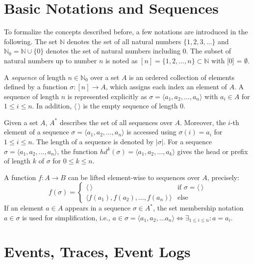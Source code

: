 \section{Basic Notations and Sequences}

To formalize the concepts described before, a few notations are introduced in the following.
The set $\mathbb{N}$ denotes the set of all natural numbers $\{1, 2, 3, \dots\}$ and $\mathbb{N}_0 = \mathbb{N} \cup \{0\}$ denotes the set of natural numbers including 0.
The subset of natural numbers up to number $n$ is noted as $[n] = \{1, 2, \dots, n\} \subset \mathbb{N}$ with [0] = $\emptyset$.
\begin{definition}[Sequence]
		A \textit{sequence} of length $n \in \mathbb{N}_0$ over a set $A$ is an ordered collection of elements defined by a function $\sigma \colon [n]\to A$, which assigns each index an element of $A$.
		A sequence  of length $n$ is represented explicitly as $\sigma = \langle a_1, a_2, \dots, a_n\rangle $ with $a_i \in A$ for $1 \leq i \leq n$. In addition, $\langle~\rangle$ is the empty sequence of length $0$.
\end{definition}
Given a set $A$, $A^*$ describes the set of all sequences over $A$.
Moreover, the $i$-th element of a sequence $\sigma = \langle a_1, a_2, \dots, a_n\rangle$ is accessed using $\sigma(i)= a_i$ for $1 \leq i \leq n$.
The length of a sequence is denoted by $|\sigma|$.
For a sequence $\sigma=\langle a_1, a_2, \dots, a_n\rangle$, the function
$hd^k(\sigma)= \langle a_1, a_2, \dots, a_k\rangle$ gives the head or prefix of length $k$ of $\sigma$ for $0 \leq k \leq n$.

A function $f \colon A \to B$ can be lifted element-wise to sequences over $A$, precisely:
\begin{equation*}
f(\sigma) =
\begin{cases}
\langle~\rangle & \text{if $\sigma = \langle~\rangle$} \\
\langle f(a_1), f(a_2), \dots, f(a_n)\rangle & \text{else} 
\end{cases}
\end{equation*}
If an element $a \in A$ appears in a sequence $\sigma \in A^*$, the set membership notation $a \in \sigma$ is used for simplification, i.e., $a \in \sigma = \langle a_1, a_2, \dots a_n \rangle \iff \exists_{1 \leq i \leq n} \colon a = a_i$.

\section{Events, Traces, Event Logs}

